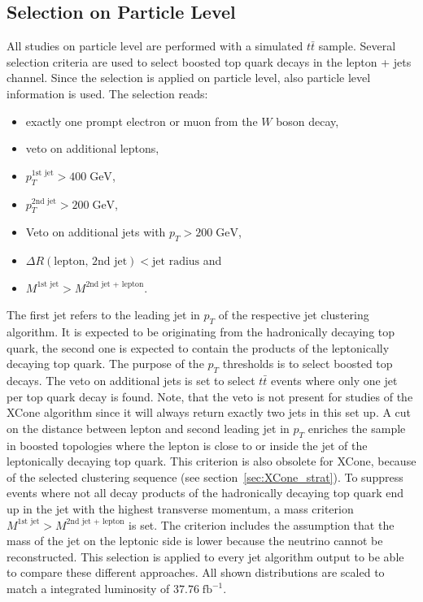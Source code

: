 \subsection{Selection on Particle Level}
\label{sec:GenSel}
	All studies on particle level are performed with a simulated $t\bar{t}$ sample. Several selection criteria are used to select boosted top quark decays in the lepton + jets channel. Since the selection is applied on particle level, also particle level information is used. The selection reads:
	\begin{itemize}
	\item exactly one prompt electron or muon from the $W$ boson decay,
	\item veto on additional leptons,
	\item $p_T^{\text{1st jet}} > 400\;\text{GeV}$,
	\item $p_T^{\text{2nd jet}} > 200\;\text{GeV}$,
	\item Veto on additional jets with $p_T > 200\;\text{GeV}$,
	\item $\Delta R (\text{lepton, 2nd jet}) < \text{jet radius}$ and
	\item $M^{\text{1st jet}} > M^{\text{2nd jet + lepton}}$.
	\end{itemize}
	The first jet refers to the leading jet in $p_T$ of the respective jet clustering algorithm. It is expected to be originating from the hadronically decaying top quark, the second one is expected to contain the products of the leptonically decaying top quark. The purpose of the $p_T$ thresholds is to select boosted top decays. The veto on additional jets is set to select $t\bar{t}$ events where only one jet per top quark decay is found. Note, that the veto is not present for studies of the XCone algorithm since it will always return exactly two jets in this set up. A cut on the distance between lepton and second leading jet in $p_T$ enriches the sample in boosted topologies where the lepton is close to or inside the jet of the leptonically decaying top quark. This criterion is also obsolete for XCone, because of the selected clustering sequence (see section~\ref{sec:XCone_strat}). To suppress events where not all decay products of the hadronically decaying top quark end up in the jet with the highest transverse momentum, a mass criterion $M^{\text{1st jet}} > M^{\text{2nd jet + lepton}}$ is set. The criterion includes the assumption that the mass of the jet on the leptonic side is lower because the neutrino cannot be reconstructed. This selection is applied to every jet algorithm output to be able to compare these different approaches. All shown distributions are scaled to match a integrated luminosity of $37.76\;\text{fb}^{-1}$.

